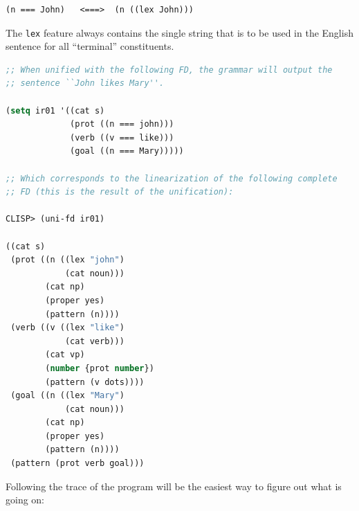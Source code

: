 \documentclass[10pt,a4paper]{report}
\begin{document}
\begin{lstlisting}
(n === John)   <===>  (n ((lex John)))
\end{lstlisting}

The {\tt lex} feature always contains the single string that is to be
used in the English sentence for all ``terminal'' constituents.



\begin{lstlisting}[language=Lisp]
;; When unified with the following FD, the grammar will output the
;; sentence ``John likes Mary''.

(setq ir01 '((cat s) 
             (prot ((n === john))) 
             (verb ((v === like))) 
             (goal ((n === Mary)))))

;; Which corresponds to the linearization of the following complete
;; FD (this is the result of the unification):

CLISP> (uni-fd ir01)

((cat s)
 (prot ((n ((lex "john") 
            (cat noun))) 
		(cat np) 
		(proper yes) 
		(pattern (n))))
 (verb ((v ((lex "like") 
			(cat verb))) 
		(cat vp) 
		(number {prot number}) 
		(pattern (v dots))))
 (goal ((n ((lex "Mary") 
			(cat noun))) 
		(cat np) 
		(proper yes) 
		(pattern (n))))
 (pattern (prot verb goal)))
\end{lstlisting}


Following the trace of the program will be the easiest way to
figure out what is going on:
\end{document}
